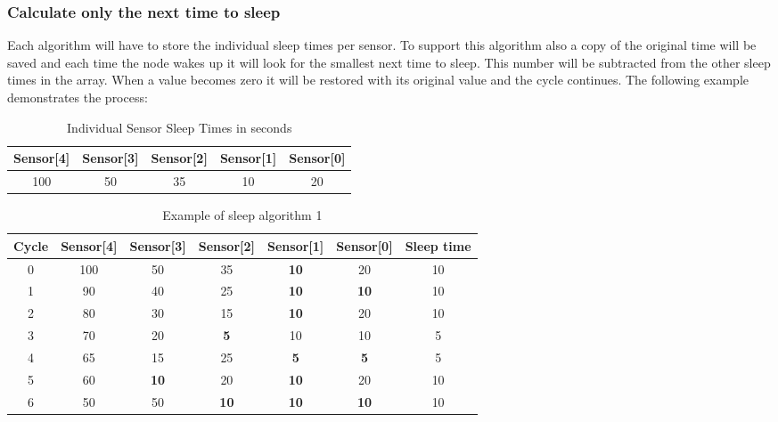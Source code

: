 \subsubsection{Calculate only the next time to sleep}
Each algorithm will have to store the individual sleep times per sensor. To support this algorithm also a copy of the original time will be saved and each time the node wakes up it will look for the smallest next time to sleep. This number will be subtracted from the other sleep times in the array. When a value becomes zero it will be restored with its original value and the cycle continues.  The following example demonstrates the process:\\
\begin{table}[!hb]
\begin{center}
\begin{tabular}[!hb]{|c|c|c|c|c|}
\hline
\textbf{Sensor[4]} & \textbf{Sensor[3]} & \textbf{Sensor[2]} & \textbf{Sensor[1]} &\textbf{Sensor[0]}\\
\hline
100  & 50 & 35 & 10 & 20\\
\hline
\end{tabular}
\caption{Individual Sensor Sleep Times in seconds}
\label{tab:sleep1}
\end{center}
\end{table}
\begin{table}[!ht]
\begin{center}
\begin{tabular}[!ht]{|c|c|c|c|c|c|c|}
\hline
\textbf{Cycle} & \textbf{Sensor[4]} & \textbf{Sensor[3]} & \textbf{Sensor[2]} & \textbf{Sensor[1]} &\textbf{Sensor[0]} & \textbf{Sleep time}\\
\hline
0 & 100 & 50 & 35 & \textbf{10} & 20 & 10\\
\hline
1 & 90 & 40 & 25 & \textbf{10} & \textbf{10} & 10\\
\hline
2 & 80 & 30 & 15 & \textbf{10} & 20 & 10\\
\hline
3 & 70 & 20 & \textbf{5} & 10 & 10 & 5\\
\hline
4 & 65 & 15 & 25 & \textbf{5} & \textbf{5} & 5\\
\hline
5 & 60 & \textbf{10} & 20 & \textbf{10} & 20 & 10\\
\hline
6 & 50 & 50 & \textbf{10} & \textbf{10} & \textbf{10} & 10\\
\hline
\end{tabular}
\caption{Example of sleep algorithm 1}
\label{tab:sleep2}
\end{center}
\end{table}
